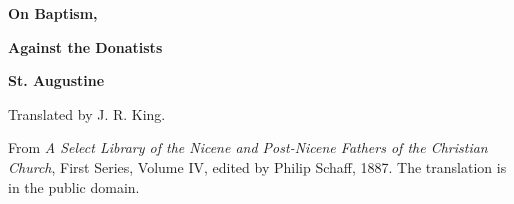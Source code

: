 \documentclass[11pt,letterpaper]{article}
\begin{document}
\color{ink}

\begin{titlepage}
\centering
\vspace*{4em}
{\LARGE\bfseries\color{heading} On Baptism,\par}
\vspace{0.5em}
{\LARGE\bfseries\color{heading} Against the Donatists\par}
\vspace{2em}
{\LARGE\bfseries\color{heading} St. Augustine\par}
\vspace{3em}
{Translated by J. R. King.\par}
\vfill
{\small From \emph{A Select Library of the Nicene and Post-Nicene Fathers of
the Christian Church}, First Series, Volume IV, edited by Philip Schaff,
1887. The translation is in the public domain.\par}
\vspace{2em}
\end{titlepage}

\tableofcontents
\clearpage


\end{document}
